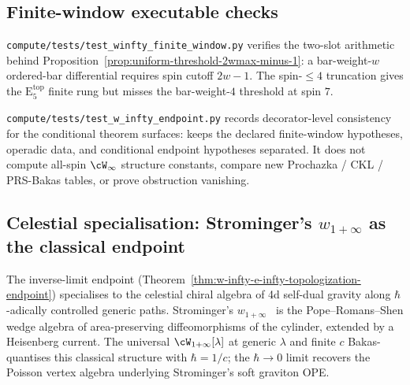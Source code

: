 \subsection{Finite-window executable checks}
\label{subsec:w-infty-endpoint-tests}

\texttt{compute/tests/test\_winfty\_finite\_window.py} verifies the
two-slot arithmetic behind
Proposition~\ref{prop:uniform-threshold-2wmax-minus-1}: a
bar-weight-\(w\) ordered-bar differential requires spin cutoff
\(2w-1\). The spin-\(\le 4\) truncation gives the
\(\mathrm{E}_5^{\mathrm{top}}\) finite rung but misses the
bar-weight-\(4\) threshold at spin \(7\).

\texttt{compute/tests/test\_w\_infty\_endpoint.py} records
decorator-level consistency for the conditional theorem surfaces:
keeps the declared finite-window hypotheses, operadic data, and
conditional endpoint hypotheses separated. It does not compute
all-spin \(\cW_\infty\) structure constants, compare new
Prochazka / CKL / PRS-Bakas tables, or prove obstruction
vanishing.

\providecommand{\wtc}{\mathfrak{w}_{1+\infty}}

\subsection{Celestial specialisation: Strominger's
\texorpdfstring{$w_{1+\infty}$}{w1+infty} as the classical endpoint}
\label{subsec:celestial-specialisation-strominger}

The inverse-limit endpoint
(Theorem~\ref{thm:w-infty-e-infty-topologization-endpoint})
specialises to the celestial chiral algebra of 4d self-dual
gravity along \(\hbar\)-adically controlled generic paths.
Strominger's $w_{1+\infty}$~\cite{StromingerWInfinityCelestial} is
the Pope--Romans--Shen wedge algebra of area-preserving
diffeomorphisms of the cylinder, extended by a Heisenberg current.
The universal $\cW_{1+\infty}[\lambda]$ at generic $\lambda$ and
finite $c$ Bakas-quantises this classical structure with
$\hbar = 1/c$; the $\hbar\to 0$ limit recovers the Poisson vertex
algebra underlying Strominger's soft graviton OPE.

